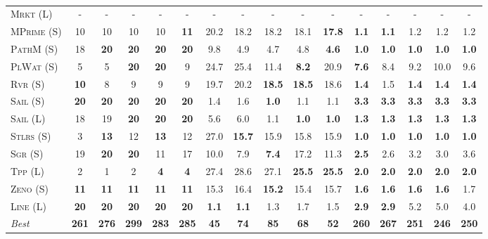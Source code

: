 \documentclass[11pt,landscape]{article}
\begin{document}
\begin{table*}[tb]
{\begin{tabular}{|l||ccccc||ccccc||ccccc||}
\textsc{Mrkt} (L)&-&-&-&-&-&-&-&-&-&-&-&-&-&-&-\\
\textsc{MPrime} (S)&10&10&10&10&\textbf{11}&20.2&18.2&18.2&18.1&\textbf{17.8}&\textbf{1.1}&\textbf{1.1}&1.2&1.2&1.2\\
\textsc{PathM} (S)&18&\textbf{20}&\textbf{20}&\textbf{20}&\textbf{20}&9.8&4.9&4.7&4.8&\textbf{4.6}&\textbf{1.0}&\textbf{1.0}&\textbf{1.0}&\textbf{1.0}&\textbf{1.0}\\
\textsc{PlWat} (S)&5&5&\textbf{20}&\textbf{20}&9&24.7&25.4&11.4&\textbf{8.2}&20.9&\textbf{7.6}&8.4&9.2&10.0&9.6\\
\textsc{Rvr} (S)&\textbf{10}&8&9&9&9&19.7&20.2&\textbf{18.5}&\textbf{18.5}&18.6&\textbf{1.4}&1.5&\textbf{1.4}&\textbf{1.4}&\textbf{1.4}\\
\textsc{Sail} (S)&\textbf{20}&\textbf{20}&\textbf{20}&\textbf{20}&\textbf{20}&1.4&1.6&\textbf{1.0}&1.1&1.1&\textbf{3.3}&\textbf{3.3}&\textbf{3.3}&\textbf{3.3}&\textbf{3.3}\\
\textsc{Sail} (L)&18&19&\textbf{20}&\textbf{20}&\textbf{20}&5.6&6.0&1.1&\textbf{1.0}&\textbf{1.0}&\textbf{1.3}&\textbf{1.3}&\textbf{1.3}&\textbf{1.3}&\textbf{1.3}\\
\textsc{Stlrs} (S)&3&\textbf{13}&12&\textbf{13}&12&27.0&\textbf{15.7}&15.9&15.8&15.9&\textbf{1.0}&\textbf{1.0}&\textbf{1.0}&\textbf{1.0}&\textbf{1.0}\\
\textsc{Sgr} (S)&19&\textbf{20}&\textbf{20}&11&17&10.0&7.9&\textbf{7.4}&17.2&11.3&\textbf{2.5}&2.6&3.2&3.0&3.6\\
\textsc{Tpp} (L)&2&1&2&\textbf{4}&\textbf{4}&27.4&28.6&27.1&\textbf{25.5}&\textbf{25.5}&\textbf{2.0}&\textbf{2.0}&\textbf{2.0}&\textbf{2.0}&\textbf{2.0}\\
\textsc{Zeno} (S)&\textbf{11}&\textbf{11}&\textbf{11}&\textbf{11}&\textbf{11}&15.3&16.4&\textbf{15.2}&15.4&15.7&\textbf{1.6}&\textbf{1.6}&\textbf{1.6}&\textbf{1.6}&1.7\\
\textsc{Line} (L)&\textbf{20}&\textbf{20}&\textbf{20}&\textbf{20}&\textbf{20}&\textbf{1.1}&\textbf{1.1}&1.3&1.7&1.5&\textbf{2.9}&\textbf{2.9}&5.2&5.0&4.0
\\\hline
\textit{Best}&\textbf{261}&\textbf{276}&\textbf{299}&\textbf{283}&\textbf{285}&\textbf{45}&\textbf{74}&\textbf{85}&\textbf{68}&\textbf{52}&\textbf{260}&\textbf{267}&\textbf{251}&\textbf{246}&\textbf{250}\\\hline

        \end{tabular}}
        \caption{}
        \label{tab:all-patty}
        \end{table*}
        
\end{document}
